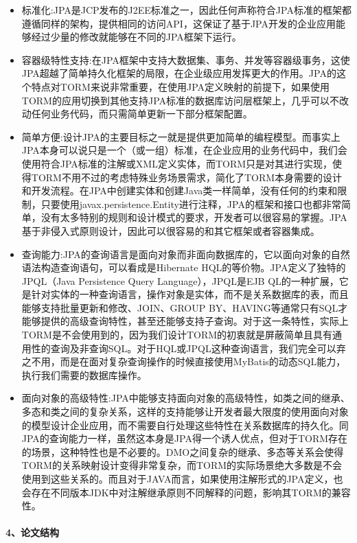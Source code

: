 \documentclass[]{article}
\begin{document}
\begin{itemize}
\itemsep1pt\parskip0pt
\item
  标准化:JPA是JCP发布的J2EE标准之一，因此任何声称符合JPA标准的框架都遵循同样的架构，提供相同的访问API，这保证了基于JPA开发的企业应用能够经过少量的修改就能够在不同的JPA框架下运行。
\item
  容器级特性支持:在JPA框架中支持大数据集、事务、并发等容器级事务，这使JPA超越了简单持久化框架的局限，在企业级应用发挥更大的作用。JPA的这个特点对TORM来说非常重要，在使用JPA定义映射的前提下，如果使用TORM的应用切换到其他支持JPA标准的数据库访问层框架上，几乎可以不改动任何业务代码，而只需简单更新一下部分框架配置。
\item
  简单方便:设计JPA的主要目标之一就是提供更加简单的编程模型。而事实上JPA本身可以说只是一个（或一组）标准，在企业应用的业务代码中，我们会使用符合JPA标准的注解或XML定义实体，而TORM只是对其进行实现，使得TORM不用不过的考虑特殊业务场景需求，简化了TORM本身需要的设计和开发流程。在JPA中创建实体和创建Java类一样简单，没有任何的约束和限制，只要使用javax.persistence.Entity进行注释，JPA的框架和接口也都非常简单，没有太多特别的规则和设计模式的要求，开发者可以很容易的掌握。JPA基于非侵入式原则设计，因此可以很容易的和其它框架或者容器集成。
\item
  查询能力:JPA的查询语言是面向对象而非面向数据库的，它以面向对象的自然语法构造查询语句，可以看成是Hibernate
  HQL的等价物。JPA定义了独特的JPQL（Java Persistence Query
  Language），JPQL是EJB
  QL的一种扩展，它是针对实体的一种查询语言，操作对象是实体，而不是关系数据库的表，而且能够支持批量更新和修改、JOIN、GROUP
  BY、HAVING等通常只有SQL才能够提供的高级查询特性，甚至还能够支持子查询。对于这一条特性，实际上TORM是不会使用到的，因为我们设计TORM的初衷就是屏蔽简单且具有通用性的查询及非查询SQL。对于HQL或JPQL这种查询语言，我们完全可以弃之不用，而是在面对复杂查询操作的时候直接使用MyBatis的动态SQL能力，执行我们需要的数据库操作。
\item
  面向对象的高级特性:JPA中能够支持面向对象的高级特性，如类之间的继承、多态和类之间的复杂关系，这样的支持能够让开发者最大限度的使用面向对象的模型设计企业应用，而不需要自行处理这些特性在关系数据库的持久化。同JPA的查询能力一样，虽然这本身是JPA得一个诱人优点，但对于TORM存在的场景，这种特性也是不必要的。DMO之间复杂的继承、多态等关系会使得TORM的关系映射设计变得非常复杂，而TORM的实际场景绝大多数是不会使用到这些关系的。而且对于JAVA而言，如果使用注解形式的JPA定义，也会存在不同版本JDK中对注解继承原则不同解释的问题，影响其TORM的兼容性。
\end{itemize}

\paragraph{4、论文结构}\label{ux8bbaux6587ux7ed3ux6784}
\end{document}
